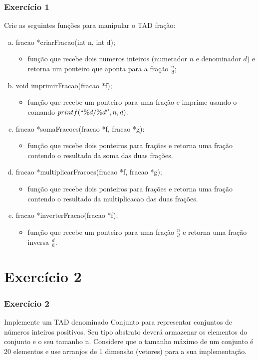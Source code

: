 \documentclass[aspectratio=169]{beamer}
\begin{document}
\begin{frame}
\frametitle{Exercício 1}
Crie as seguintes funções para manipular o TAD fração:
\begin{enumerate}[a)]
 \item fracao *criarFracao(int n, int d);
 \begin{itemize}
  \item função que recebe dois numeros inteiros (numerador $n$ e denominador $d$) e retorna um ponteiro que aponta para a fração $\frac{n}{d}$;
 \end{itemize}
 \item void imprimirFracao(fracao *f); 
 \begin{itemize}
  \item função que recebe um ponteiro para uma fração e imprime usando o comando $printf(``\%d / \%d'', n, d);$
 \end{itemize}
 \item fracao *somaFracoes(fracao *f, fracao *g):
 \begin{itemize}
  \item função que recebe dois ponteiros para frações e retorna uma fração contendo o resultado da soma das duas frações.
 \end{itemize}
 \item fracao *multiplicarFracoes(fracao *f, fracao *g);
 \begin{itemize}
  \item função que recebe dois ponteiros para frações e retorna uma fração contendo o resultado da multiplicacao das duas frações.
 \end{itemize} 
 \item fracao *inverterFracao(fracao *f);
 \begin{itemize}
  \item função que recebe um ponteiro para uma fração $\frac{n}{d}$ e retorna uma fração inversa $\frac{d}{n}$.
 \end{itemize} 
\end{enumerate}

\end{frame}



\section{Exercício 2}

\begin{frame}
\frametitle{Exercício 2}
Implemente um TAD denominado Conjunto para representar conjuntos de números inteiros positivos. Seu tipo abstrato deverá armazenar os elementos do conjunto e o seu tamanho n. Considere que o tamanho máximo de um conjunto é 20 elementos e use arranjos de 1 dimensão (vetores) para a sua implementação. 
\end{frame}
\end{document}

